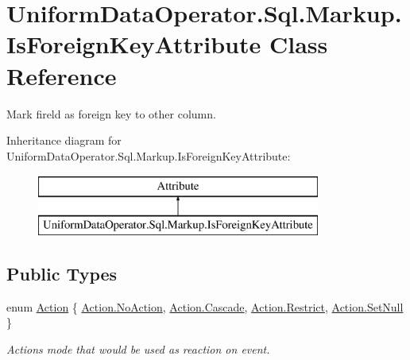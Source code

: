 \hypertarget{class_uniform_data_operator_1_1_sql_1_1_markup_1_1_is_foreign_key_attribute}{}\section{Uniform\+Data\+Operator.\+Sql.\+Markup.\+Is\+Foreign\+Key\+Attribute Class Reference}
\label{class_uniform_data_operator_1_1_sql_1_1_markup_1_1_is_foreign_key_attribute}


Mark fireld as foreign key to other column.  


Inheritance diagram for Uniform\+Data\+Operator.\+Sql.\+Markup.\+Is\+Foreign\+Key\+Attribute\+:\begin{figure}[H]
\begin{center}
\leavevmode
\includegraphics[height=2.000000cm]{dd/d33/class_uniform_data_operator_1_1_sql_1_1_markup_1_1_is_foreign_key_attribute}
\end{center}
\end{figure}
\subsection*{Public Types}
\begin{DoxyCompactItemize}
\item 
enum \mbox{\hyperlink{class_uniform_data_operator_1_1_sql_1_1_markup_1_1_is_foreign_key_attribute_ae6c77deaf80d5c4d07709edf51eaebc5}{Action}} \{ \mbox{\hyperlink{class_uniform_data_operator_1_1_sql_1_1_markup_1_1_is_foreign_key_attribute_ae6c77deaf80d5c4d07709edf51eaebc5a1e601ea653db1c729c9ee5746730fabe}{Action.\+No\+Action}}, 
\mbox{\hyperlink{class_uniform_data_operator_1_1_sql_1_1_markup_1_1_is_foreign_key_attribute_ae6c77deaf80d5c4d07709edf51eaebc5a2dc2b15e8b0ee7ed3fdd4cf53ad0a8c3}{Action.\+Cascade}}, 
\mbox{\hyperlink{class_uniform_data_operator_1_1_sql_1_1_markup_1_1_is_foreign_key_attribute_ae6c77deaf80d5c4d07709edf51eaebc5a034d70b46e41ec9d0306b0001e04cae7}{Action.\+Restrict}}, 
\mbox{\hyperlink{class_uniform_data_operator_1_1_sql_1_1_markup_1_1_is_foreign_key_attribute_ae6c77deaf80d5c4d07709edf51eaebc5a2ac481dd701d4f580b6b01eb34442e71}{Action.\+Set\+Null}}
 \}
\begin{DoxyCompactList}\small\item\em Action\textquotesingle{}s mode that would be used as reaction on event. \end{DoxyCompactList}\end{DoxyCompactItemize}
